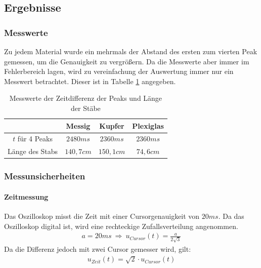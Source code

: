 \documentclass[11pt, a4paper]{article}
\begin{document}
    \subsection{Ergebnisse}
    \subsubsection{Messwerte}
    Zu jedem Material wurde ein mehrmals der Abstand des ersten zum
    vierten Peak gemessen, um die Genauigkeit zu vergrößern. Da die Messwerte aber immer im Fehlerbereich lagen,
    wird zu vereinfachung der Auswertung immer nur ein Messwert betrachtet. Dieser ist in Tabelle \ref{ex:mess1}
    angegeben. 
    \begin{table}[!th]
        \centering
        \begin{tabular}{c | c | c | c}
           & Messig & Kupfer & Plexiglas \\ \hline
            $ t $ für 4 Peaks & $ 2480ms $ & $ 2360ms $ & $ 2360ms $ \\ \hline
            Länge des Stabs & $140,7cm$ & $150,1cm$ & $74,6cm$ \\
        \end{tabular}
        \caption{Messwerte der Zeitdifferenz der Peaks und Länge der  Stäbe}
        \label{ex:mess1}
    \end{table}
    \subsubsection{Messunsicherheiten}
    \paragraph{Zeitmessung}
    Das Oszilloskop misst die Zeit mit einer Cursorgenauigkeit von $ 20ms $. Da das Oszilloskop digital ist, wird
    eine rechteckige Zufallsverteilung angenommen.
    \begin{align}
        a = 20ms \ \Rightarrow \ u_{Cursor}(t) = \frac{a}{2 \sqrt{3}}
    \end{align}
    Da die Differenz jedoch mit zwei Cursor gemesser wird, gilt:
    \begin{align}
        u_{Zeit}(t) = \sqrt{2} \cdot u_{Cursor}(t)
    \end{align}
\end{document}

